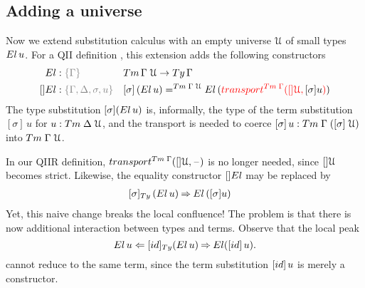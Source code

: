 \documentclass[a4paper,UKenglish,numberwithinsect,cleveref,thm-restate]{lipics-v2021}
\begin{document}
\subsection{Adding a universe} \label{subsec:SC+U}
Now we extend substitution calculus with an empty universe $\mathcal{U}$ of small types~$\El\,u$.
For a QII definition \cite{Altenkirch2016a}, this extension adds the following constructors
\begin{alignat*}{3}
  \El   & : \implicit{\Gamma} && \Tm\,\Gamma\;\UU \to \Ty\,\Gamma \\
  []\El & : \implicit{\Gamma, \Delta, \sigma, u} && [ \sigma ]\,(\El\, u) =^{\Tm\;\Gamma\;\UU} \El\,(\alert{\transfib{\Tm\;\Gamma}{[]\UU}{\color{black}[\sigma]{u}}})
\end{alignat*}
The type substitution $[\sigma](\El\,u)$ is, informally, the type of the term substitution $[\sigma]\,u$ for $u : \Tm\;\Delta\;\UU$, and the transport is needed to coerce $[\sigma]\,u : \Tm\;\Gamma\;([\sigma]\;\UU)$ into $\Tm\;\Gamma\;\UU$.

In our QIIR definition, $\transfib{\Tm\;\Gamma}{[]\UU}{\blank}$ is no longer needed, since $[]\mathcal{U}$ becomes strict. 
Likewise, the equality constructor $[]\El$ may be replaced by 
\begin{alignat*}{3}
  [ \sigma ]_{\Ty}\,(\El\, u) & \reduce \El\,([\sigma] {u})
\end{alignat*}
Yet, this naive change breaks the local confluence!
The problem is that there is now additional interaction between types and terms. Observe that the local peak
\[
  \El\,u \Leftarrow [\idS]_{\Ty}(\El\,u) \reduce \El([\idS]\,u).
\]
cannot reduce to the same term, since the term substitution $[\idS]\,u$ is merely a constructor.
\end{document}
